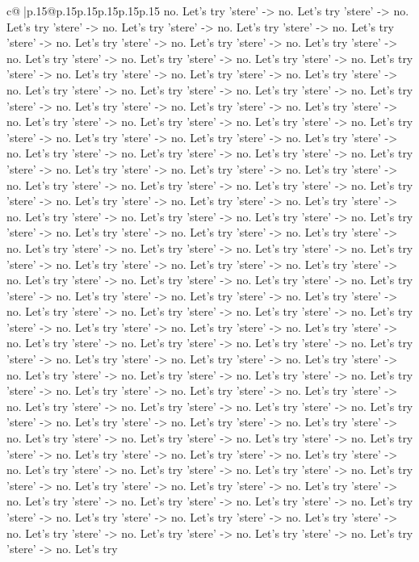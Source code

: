 \documentclass{article}
\begin{document}
{\begin{supertabular}{c@{$\;$}|p{.15\linewidth}@{}p{.15\linewidth}p{.15\linewidth}p{.15\linewidth}p{.15\linewidth}p{.15\linewidth}}
{{{no. Let's try 'stere' {-}> no. Let's try 'stere' {-}> no. Let's try 'stere' {-}> no. Let's try 'stere' {-}> no. Let's try 'stere' {-}> no. Let's try 'stere' {-}> no. Let's try 'stere' {-}> no. Let's try 'stere' {-}> no. Let's try 'stere' {-}> no. Let's try 'stere' {-}> no. Let's try 'stere' {-}> no. Let's try 'stere' {-}> no. Let's try 'stere' {-}> no. Let's try 'stere' {-}> no. Let's try 'stere' {-}> no. Let's try 'stere' {-}> no. Let's try 'stere' {-}> no. Let's try 'stere' {-}> no. Let's try 'stere' {-}> no. Let's try 'stere' {-}> no. Let's try 'stere' {-}> no. Let's try 'stere' {-}> no. Let's try 'stere' {-}> no. Let's try 'stere' {-}> no. Let's try 'stere' {-}> no. Let's try 'stere' {-}> no. Let's try 'stere' {-}> no. Let's try 'stere' {-}> no. Let's try 'stere' {-}> no. Let's try 'stere' {-}> no. Let's try 'stere' {-}> no. Let's try 'stere' {-}> no. Let's try 'stere' {-}> no. Let's try 'stere' {-}> no. Let's try 'stere' {-}> no. Let's try 'stere' {-}> no. Let's try 'stere' {-}> no. Let's try 'stere' {-}> no. Let's try 'stere' {-}> no. Let's try 'stere' {-}> no. Let's try 'stere' {-}> no. Let's try 'stere' {-}> no. Let's try 'stere' {-}> no. Let's try 'stere' {-}> no. Let's try 'stere' {-}> no. Let's try 'stere' {-}> no. Let's try 'stere' {-}> no. Let's try 'stere' {-}> no. Let's try 'stere' {-}> no. Let's try 'stere' {-}> no. Let's try 'stere' {-}> no. Let's try 'stere' {-}> no. Let's try 'stere' {-}> no. Let's try 'stere' {-}> no. Let's try 'stere' {-}> no. Let's try 'stere' {-}> no. Let's try 'stere' {-}> no. Let's try 'stere' {-}> no. Let's try 'stere' {-}> no. Let's try 'stere' {-}> no. Let's try 'stere' {-}> no. Let's try 'stere' {-}> no. Let's try 'stere' {-}> no. Let's try 'stere' {-}> no. Let's try 'stere' {-}> no. Let's try 'stere' {-}> no. Let's try 'stere' {-}> no. Let's try 'stere' {-}> no. Let's try 'stere' {-}> no. Let's try 'stere' {-}> no. Let's try 'stere' {-}> no. Let's try 'stere' {-}> no. Let's try 'stere' {-}> no. Let's try 'stere' {-}> no. Let's try 'stere' {-}> no. Let's try 'stere' {-}> no. Let's try 'stere' {-}> no. Let's try 'stere' {-}> no. Let's try 'stere' {-}> no. Let's try 'stere' {-}> no. Let's try 'stere' {-}> no. Let's try 'stere' {-}> no. Let's try 'stere' {-}> no. Let's try 'stere' {-}> no. Let's try 'stere' {-}> no. Let's try 'stere' {-}> no. Let's try 'stere' {-}> no. Let's try 'stere' {-}> no. Let's try 'stere' {-}> no. Let's try 'stere' {-}> no. Let's try 'stere' {-}> no. Let's try 'stere' {-}> no. Let's try 'stere' {-}> no. Let's try 'stere' {-}> no. Let's try 'stere' {-}> no. Let's try 'stere' {-}> no. Let's try 'stere' {-}> no. Let's try 'stere' {-}> no. Let's try 'stere' {-}> no. Let's try 'stere' {-}> no. Let's try 'stere' {-}> no. Let's try 'stere' {-}> no. Let's try 'stere' {-}> no. Let's try 'stere' {-}> no. Let's try 'stere' {-}> no. Let's try 'stere' {-}> no. Let's try 'stere' {-}> no. Let's try 'stere' {-}> no. Let's try 'stere' {-}> no. Let's try 'stere' {-}> no. Let's try 'stere' {-}> no. Let's try 'stere' {-}> no. Let's try 'stere' {-}> no. Let's try 'stere' {-}> no. Let's try 'stere' {-}> no. Let's try 'stere' {-}> no. Let's try 'stere' {-}> no. Let's try 'stere' {-}> no. Let's try }}}
\end{supertabular}}
\end{document}
